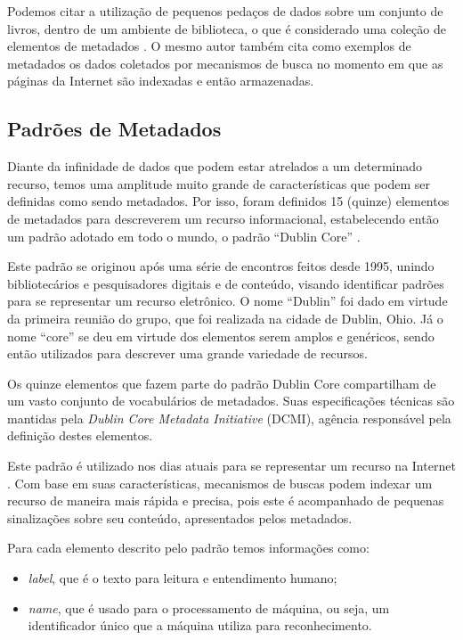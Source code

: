 Podemos citar a utilização de pequenos pedaços de dados sobre um conjunto de livros, dentro de um ambiente de biblioteca, o que é considerado uma coleção de elementos de metadados \cite{meta-dados}. O mesmo autor também cita como exemplos de metadados os dados coletados por mecanismos de busca no momento em que as páginas da Internet são indexadas e então armazenadas.

\subsection{Padrões de Metadados}
\label{ssec:metadata-patterns}

Diante da infinidade de dados que podem estar atrelados a um determinado recurso, temos uma amplitude muito grande de características que podem ser definidas como sendo metadados. Por isso, foram definidos 15 (quinze) elementos de metadados para descreverem um recurso informacional, estabelecendo então um padrão adotado em todo o mundo, o padrão ``Dublin Core'' \cite{dublin-core}.

Este padrão se originou após uma série de encontros feitos desde 1995, unindo bibliotecários e pesquisadores digitais e de conteúdo, visando identificar padrões para se representar um recurso eletrônico. O nome ``Dublin'' foi dado em virtude da primeira reunião do grupo, que foi realizada na cidade de Dublin, Ohio. Já o nome ``core'' se deu em virtude dos elementos serem amplos e genéricos, sendo então utilizados para descrever uma grande variedade de recursos.

Os quinze elementos que fazem parte do padrão Dublin Core compartilham de um vasto conjunto de vocabulários de metadados. Suas especificações técnicas são mantidas pela \emph{Dublin Core Metadata Initiative} (DCMI), agência responsável pela definição destes elementos.

Este padrão é utilizado nos dias atuais para se representar um recurso na Internet \cite{dublin-core-1-1}. Com base em suas características, mecanismos de buscas podem indexar um recurso de maneira mais rápida e precisa, pois este é acompanhado de pequenas sinalizações sobre seu conteúdo, apresentados pelos metadados. 

Para cada elemento descrito pelo padrão temos informações como: 

\begin{itemize}
    \item \textit{label}, que é o texto para leitura e entendimento humano;
    \item \textit{name}, que é usado para o processamento de máquina, ou seja, um identificador único que a máquina utiliza para reconhecimento.
\end{itemize}

